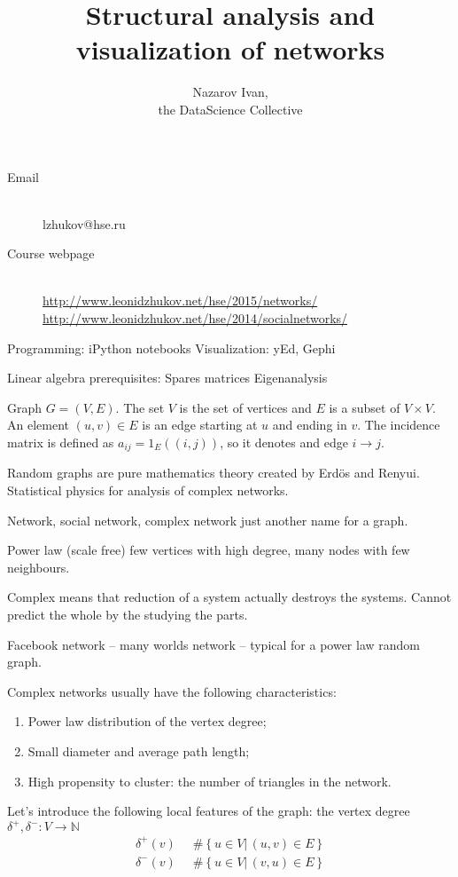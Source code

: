 \documentclass[a4paper]{article}
\title{Structural analysis and visualization of networks}
\author{Nazarov Ivan, \rus{101мНОД(ИССА)}\\the DataScience Collective}
\newcommand{\obj}[1]{{\left\{ #1 \right \}}}
\newcommand{\brac}[1]{{\left ( #1 \right )}}
\newcommand{\induc}[1]{{\left . #1 \right \vert}}
\newcommand{\Ntrl}{\mathbb{N}}
\newcommand{\defn}{\mathop{\overset{\Delta}{=}}\nolimits}
\begin{document}

\maketitle

\begin{description}
	\item[Email] \hfill \\
	lzhukov@hse.ru
	\item[Course webpage] \hfill \\
	\url{http://www.leonidzhukov.net/hse/2015/networks/}
	\url{http://www.leonidzhukov.net/hse/2014/socialnetworks/}
\end{description}

Programming: iPython notebooks
Visualization: yEd, Gephi

Linear algebra prerequisites:
	Spares matrices
	Eigenanalysis


Graph $G=(V,E)$. The set $V$ is the set of vertices and $E$ is a subset of $V\times V$.
An element $(u,v)\in E$ is an edge starting at $u$ and ending in $v$.
The incidence matrix is defined as $a_{ij}=1_E\brac{(i,j)}$, so it denotes and edge $i\to j$.

Random graphs are pure mathematics theory created by Erd\"os and Renyui.
Statistical physics for analysis of complex networks.

Network, social network, complex network just another name for a graph.

Power law (scale free) few vertices with high degree, many nodes with few neighbours.

Complex means that reduction of a system actually destroys the systems.
Cannot predict the whole by the studying the parts.

Facebook network -- many worlds network -- typical for a power law random graph.

Complex networks usually have the following characteristics: \begin{enumerate}
	\item Power law distribution of the vertex degree;
	\item Small diameter and average path length;
	\item High propensity to cluster: the number of triangles in the network.
\end{enumerate}

Let's introduce the following local features of the graph: the vertex degree $\delta^+,\delta^-:V\to \Ntrl$
\begin{align*}
	\delta^+(v) &\defn \#\obj{\induc{u\in V}\, (u,v)\in E }\\
	\delta^-(v) &\defn \#\obj{\induc{u\in V}\, (v,u)\in E }
\end{align*}
\end{document}
